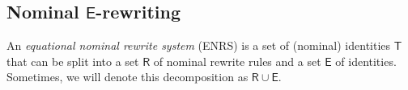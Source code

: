 \documentclass[11pt,a4paper]{amsart}
\newcommand{\alert}[1]{\textcolor{red}{#1}}
\newcommand{\theory}[1]{\ensuremath{\mathsf{#1}}}
\theoremstyle{plain}
\theoremstyle{definition}
\theoremstyle{remark}
\begin{document}
\subsection{Nominal \theory{E}-rewriting}
An {\em equational nominal rewrite system} (ENRS)   is a set of (nominal) identities $\theory{T}$ that can be split into a set $\theory{R}$ of nominal rewrite rules and a set $\theory{E}$ of identities. Sometimes, we will denote this decomposition as 
$\theory{R}{\cup}\theory{E}$.
%
\end{document}
